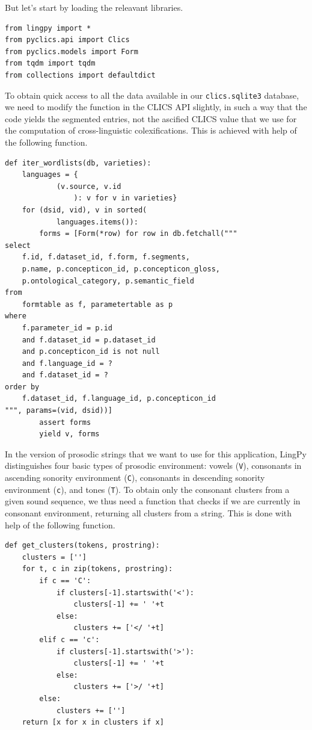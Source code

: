 \documentclass[
  english,
  a4paper,
  oneside,tablecaptionabove
]{scrbook}
\newcommand{\passthrough}[1]{#1}
\begin{document}
But let's start by loading the releavant libraries.

\begin{lstlisting}
from lingpy import *
from pyclics.api import Clics
from pyclics.models import Form
from tqdm import tqdm
from collections import defaultdict
\end{lstlisting}

To obtain quick access to all the data available in our
\passthrough{\lstinline!clics.sqlite3!} database, we need to modify the
function in the CLICS API slightly, in such a way that the code yields
the segmented entries, not the ascified CLICS value that we use for the
computation of cross-linguistic colexifications. This is achieved with
help of the following function.

\begin{lstlisting}
def iter_wordlists(db, varieties):
    languages = {
            (v.source, v.id
                ): v for v in varieties}
    for (dsid, vid), v in sorted(
            languages.items()):
        forms = [Form(*row) for row in db.fetchall("""
select
    f.id, f.dataset_id, f.form, f.segments,
    p.name, p.concepticon_id, p.concepticon_gloss,
    p.ontological_category, p.semantic_field 
from
    formtable as f, parametertable as p
where
    f.parameter_id = p.id
    and f.dataset_id = p.dataset_id
    and p.concepticon_id is not null
    and f.language_id = ?
    and f.dataset_id = ?
order by
    f.dataset_id, f.language_id, p.concepticon_id
""", params=(vid, dsid))]
        assert forms
        yield v, forms
\end{lstlisting}

In the version of prosodic strings that we want to use for this
application, LingPy distinguishes four basic types of prosodic
environment: vowels (\passthrough{\lstinline!V!}), consonants in
ascending sonority environment (\passthrough{\lstinline!C!}),
consonants in descending sonority environment (\passthrough{\lstinline!c!}),
and tones (\passthrough{\lstinline!T!}).
To obtain only the consonant clusters from a given sound sequence, we
thus need a function that checks if we are currently in consonant
environment, returning all clusters from a string. This is done with
help of the following function.

\begin{lstlisting}
def get_clusters(tokens, prostring):
    clusters = ['']
    for t, c in zip(tokens, prostring):
        if c == 'C':
            if clusters[-1].startswith('<'):
                clusters[-1] += ' '+t
            else:
                clusters += ['</ '+t]
        elif c == 'c':
            if clusters[-1].startswith('>'):
                clusters[-1] += ' '+t
            else:
                clusters += ['>/ '+t]
        else:
            clusters += ['']
    return [x for x in clusters if x]
\end{lstlisting}
\end{document}
